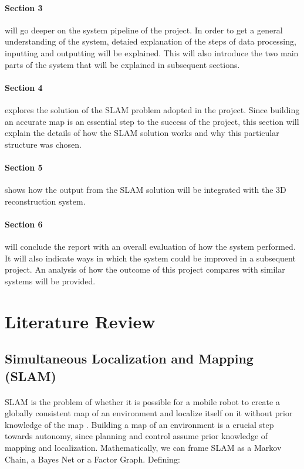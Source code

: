 \documentclass[11pt]{article}
\begin{document}
		\paragraph{Section 3} will go deeper on the system pipeline of the project. In order to get a general understanding of the system, detaied explanation of the steps of data processing, inputting and outputting will be explained. This will also introduce the two main parts of the system that will be explained in subsequent sections.
		
		\paragraph{Section 4} explores the solution of the SLAM problem adopted in the project. Since building an accurate map is an essential step to the success of the project, this section will explain the details of how the SLAM solution works and why this particular structure was chosen.
		
		\paragraph{Section 5} shows how the output from the SLAM solution will be integrated with the 3D reconstruction system.
		
		\paragraph{Section 6} will conclude the report with an overall evaluation of how the system performed. It will also indicate ways in which the system could be improved in a subsequent project. An analysis of how the outcome of this project compares with similar systems will be provided.

	\newpage
	\section{Literature Review}
	\subsection{Simultaneous Localization and Mapping (SLAM)}
	\paragraph{}
	SLAM is the problem of whether it is possible for a mobile robot to create a globally consistent map of an environment and localize itself on it without prior knowledge of the map \cite{SLAMPartI}\cite{Cadena}. Building a map of an environment is a crucial step towards autonomy, since planning and control assume prior knowledge of mapping and localization. Mathematically, we can frame SLAM as a Markov Chain, a Bayes Net or a Factor Graph. Defining:
	
\end{document}
